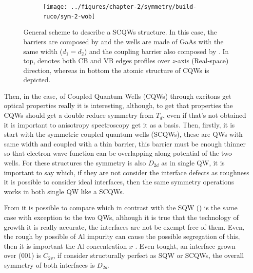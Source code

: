 \begin{figure}[ht!]
	\centering
	\begin{subfigure}{\textwidth}
		\texttt{[image: ../figures/chapter-2/symmetry/build-ruco/sym-2-wob]}
		\label{subfig:subsubsec:chapter-2-scoupled-quantum-wells-a}
		\label{subfig:subsubsec:chapter-2-scoupled-quantum-wells-b}
	\end{subfigure}
	\caption
	{
General scheme to describe a SCQWs structure. In this case, the barriers are composed by \algaas and the wells are made of GaAs with the same width ($d_{1}=d_{2}$) and the coupling barrier also composed by \algaas. In top,  denotes both CB and VB edges profiles over $z$-axis (Real-space) direction, whereas in bottom  the atomic structure of \gls{CQWs} is depicted.
	}\label{fig:subsubsec:chapter-2-scoupled-quantum-wells}
\end{figure}

Then, in the case, of Coupled Quantum Wells (\gls{CQWs}) through excitons get optical properties really it is interesting, although, to get that properties the \gls{CQWs} should get a double reduce symmetry from $T_{d}$, even if that's not obtained it is important to anisotropy spectroscopy get it as a basis. 
Then, firstly, it is start with the symmetric coupled quantum wells (\gls{SCQWs}), these are \gls{QW}s with same width and coupled with a thin barrier, this barrier must be enough thinner so that electron wave function can be overlapping along potential of the two wells. 
For these structures the symmetry is also $D_{2d}$ as in single \gls{QW}, it is important to say which, if they are not  consider the  interface defects as roughness it is possible to consider  ideal interfaces, then the same symmetry operations works in both single \gls{QW} like a \gls{SCQWs}. 

From  it is possible to compare which in contrast with the SQW () is the same case with exception to the two \gls{QW}s, although it is true that the technology of growth it is really accurate, the interfaces are not be exempt  free of them. Even, the rough by possible of Al impurity can cause the possible segregation of this, then it is important the Al concentration $x$ \cite{chand1990origin,tillmann2002direct}. Even tought, an interface grown over (001) is $C_{2v}$, if consider structurally perfect as \gls{SQW} or \gls{SCQWs}, the overall symmetry of both interfaces is $D_{2d}$\cite{magri2000anticrossing}.

